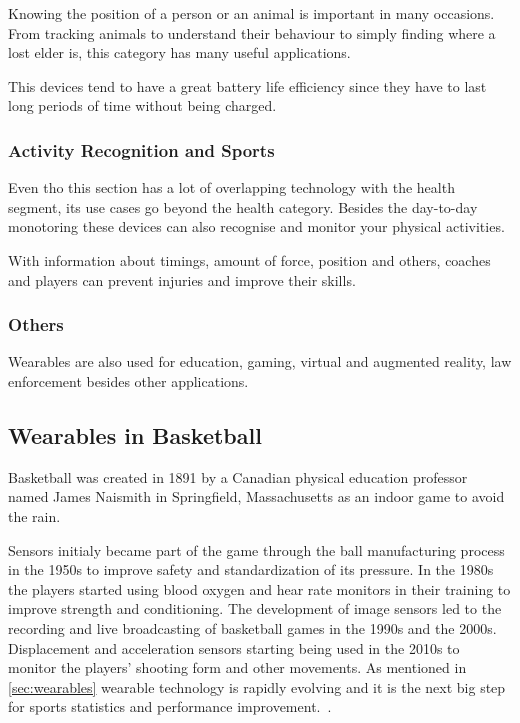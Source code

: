 Knowing the position of a person or an animal is important in many occasions. From tracking animals to understand their behaviour to simply finding where a lost elder is, this category has many useful applications.

This devices tend to have a great battery life efficiency since they have to last long periods of time without being charged. 

\subsubsection{Activity Recognition and Sports}
\label{ssub:activityRecognitionAndSports}

Even tho this section has a lot of overlapping technology with the health segment, its use cases go beyond the health category. Besides the day-to-day monotoring these devices can also recognise and monitor your physical activities.

With information about timings, amount of force, position and others, coaches and players can prevent injuries and improve their skills.

\subsubsection{Others}
\label{ssub:others}

Wearables are also used for education, gaming, virtual and augmented reality, law enforcement besides other applications.

\newpage

\subsection{Wearables in Basketball}
\label{sub:wearablesInBasketball}

Basketball was created in 1891 by a Canadian physical education professor named James Naismith in Springfield, Massachusetts as an indoor game to avoid the rain. 

Sensors initialy became part of the game through the ball manufacturing process in the 1950s to improve safety and standardization of its pressure. In the 1980s the players started 
using blood oxygen and hear rate monitors in their training to improve strength and conditioning. The development of image sensors led to the recording and live broadcasting of basketball 
games in the 1990s and the 2000s. Displacement and acceleration sensors starting being used in the 2010s to monitor the players' shooting form and other movements. As mentioned in \autoref{sec:wearables} 
wearable technology is rapidly evolving and it is the next big step for sports statistics and performance improvement.~\cite{perspective}.

